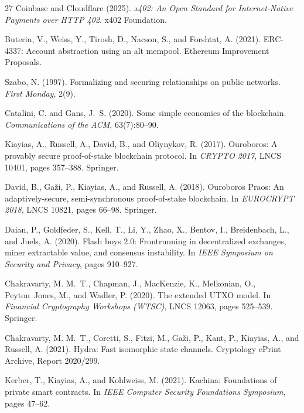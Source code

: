 \documentclass[11pt,UTF8]{ctexart}
\begin{document}
\begin{thebibliography}{27}
Coinbase and Cloudflare (2025). \emph{x402: An Open Standard for
Internet-Native Payments over {HTTP} 402}. x402 Foundation.

Buterin, V., Weiss, Y., Tirosh, D., Nacson, S., and Forshtat, A. (2021).
{ERC-4337}: Account abstraction using an alt mempool. Ethereum
Improvement Proposals.

Szabo, N. (1997). Formalizing and securing relationships on public
networks. \emph{First Monday}, 2(9).

Catalini, C. and Gans, J.~S. (2020). Some simple economics of the
blockchain. \emph{Communications of the ACM}, 63(7):80--90.

Kiayias, A., Russell, A., David, B., and Oliynykov, R. (2017). Ouroboros:
A provably secure proof-of-stake blockchain protocol. In \emph{CRYPTO
2017}, LNCS 10401, pages 357--388. Springer.

David, B., Ga\v{z}i, P., Kiayias, A., and Russell, A. (2018). Ouroboros
Praos: An adaptively-secure, semi-synchronous proof-of-stake blockchain.
In \emph{EUROCRYPT 2018}, LNCS 10821, pages 66--98. Springer.

Daian, P., Goldfeder, S., Kell, T., Li, Y., Zhao, X., Bentov, I.,
Breidenbach, L., and Juels, A. (2020). Flash boys 2.0: Frontrunning in
decentralized exchanges, miner extractable value, and consensus
instability. In \emph{IEEE Symposium on Security and Privacy}, pages
910--927.

Chakravarty, M. M.~T., Chapman, J., MacKenzie, K., Melkonian, O.,
Peyton~Jones, M., and Wadler, P. (2020). The extended {UTXO} model. In
\emph{Financial Cryptography Workshops (WTSC)}, LNCS 12063, pages
525--539. Springer.

Chakravarty, M. M.~T., Coretti, S., Fitzi, M., Ga\v{z}i, P., Kant, P.,
Kiayias, A., and Russell, A. (2021). Hydra: Fast isomorphic state
channels. Cryptology ePrint Archive, Report 2020/299.

Kerber, T., Kiayias, A., and Kohlweiss, M. (2021). Kachina: Foundations
of private smart contracts. In \emph{IEEE Computer Security Foundations
Symposium}, pages 47--62.


\end{thebibliography}
\end{document}
